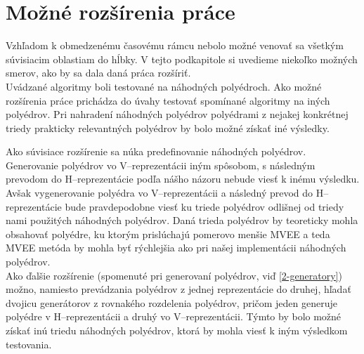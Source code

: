 \section{Možné rozšírenia práce}

Vzhľadom k obmedzenému časovému rámcu nebolo možné venovať sa všetkým súvisiacim oblastiam do hĺbky. V tejto podkapitole si uvedieme niekoľko možných smerov, ako by sa dala daná práca rozšíriť.\\

Uvádzané algoritmy boli testované na náhodných polyédroch. Ako možné rozšírenia práce prichádza do úvahy testovať spomínané algoritmy na iných polyédrov. Pri nahradení náhodných polyédrov polyédrami z nejakej konkrétnej triedy prakticky relevantných polyédrov by bolo možné získať iné výsledky. 

Ako súvisiace rozšírenie sa núka predefinovanie náhodných polyédrov. Generovanie polyédrov vo V--reprezentácii iným spôsobom, s následným prevodom do H--reprezentácie podľa nášho názoru nebude viesť k inému výsledku. Avšak vygenerovanie polyédra vo V--reprezentácii a následný prevod do H--reprezentácie bude pravdepodobne viesť ku triede polyédrov odlišnej od triedy nami použitých náhodných polyédrov. Daná trieda polyédrov by teoreticky mohla obsahovať polyédre, ku ktorým prislúchajú pomerovo menšie MVEE a teda MVEE metóda by mohla byť rýchlejšia ako pri našej implementácii náhodných polyédrov.\\

Ako ďalšie rozšírenie (spomenuté pri generovaní polyédrov, viď \ref{2-generatory}) možno, namiesto prevádzania polyédrov z jednej reprezentácie do druhej, hľadať dvojicu generátorov z rovnakého rozdelenia polyédrov, pričom jeden generuje polyédre v H--reprezentácii a druhý vo V--reprezentácii. Týmto by bolo možné získať inú triedu náhodných polyédrov, ktorá by mohla viesť k iným výsledkom testovania.







